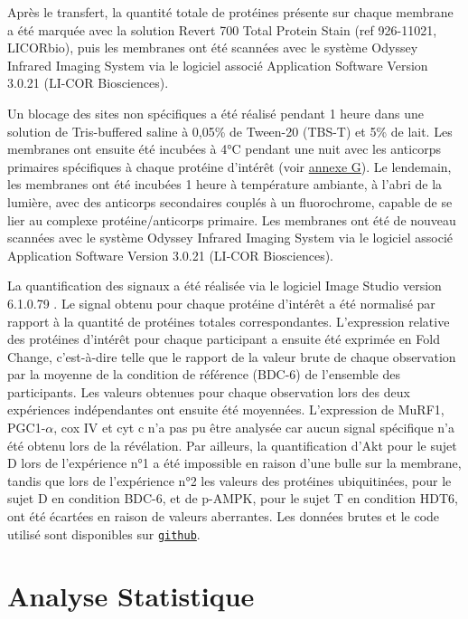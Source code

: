 \documentclass[11pt]{report}
\begin{document}
Après le transfert, la quantité totale de protéines présente sur chaque membrane a été marquée avec la solution Revert 700 Total Protein Stain (ref 926-11021, LICORbio), puis les membranes ont été scannées avec le système Odyssey Infrared Imaging System via le logiciel associé Application Software Version 3.0.21 (LI-COR Biosciences). 

Un blocage des sites non spécifiques a été réalisé pendant 1 heure dans une solution de Tris-buffered saline à 0,05\% de Tween-20 (TBS-T) et 5\% de lait. Les membranes ont ensuite été incubées à 4°C pendant une nuit avec les anticorps primaires spécifiques à chaque protéine d'intérêt (voir \hyperref[annexeG]{annexe G}). Le lendemain, les membranes ont été incubées 1 heure à température ambiante, à l'abri de la lumière, avec des anticorps secondaires couplés à un fluorochrome, capable de se lier au complexe protéine/anticorps primaire. Les membranes ont été de nouveau scannées avec le système Odyssey Infrared Imaging System via le logiciel associé Application Software Version 3.0.21 (LI-COR Biosciences).

La quantification des signaux a été réalisée via le logiciel Image Studio version 6.1.0.79 \parencite{licor_image_studio_2026}. Le signal obtenu pour chaque protéine d'intérêt a été normalisé par rapport à la quantité de protéines totales correspondantes. L'expression relative des protéines d'intérêt pour chaque participant a ensuite été exprimée en Fold Change, c'est-à-dire telle que le rapport de la valeur brute de chaque observation par la moyenne de la condition de référence (BDC-6) de l'ensemble des participants. Les valeurs obtenues pour chaque observation lors des deux expériences indépendantes ont ensuite été moyennées. L'expression de MuRF1, PGC1-$\alpha$, cox IV et cyt c n'a pas pu être analysée car aucun signal spécifique n'a été obtenu lors de la révélation. Par ailleurs, la quantification d'Akt pour le sujet D lors de l'expérience n°1 a été impossible en raison d'une bulle sur la membrane, tandis que lors de l'expérience n°2 les valeurs des protéines ubiquitinées, pour le sujet D en condition BDC-6, et de p-AMPK, pour le sujet T en condition HDT6, ont été écartées en raison de valeurs aberrantes. Les données brutes et le code utilisé sont disponibles sur \href{https://github.com/leoninerouanet/memoire_2A_env_systemique}{\texttt{github}}.

\section{Analyse Statistique}
\label{subsec:stat}
\end{document}
